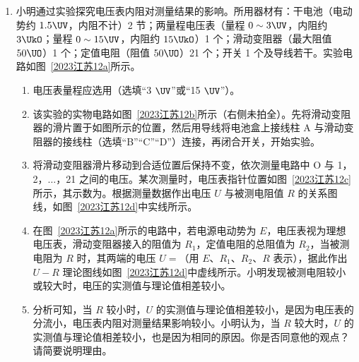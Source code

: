 \documentclass[\gkver]{gaokaozhenti}
\begin{document}
\begin{enumerate}

{经过 A 点的动能较小}
{在 A、B 之间的运动时间较短}
{在 A、B 之间克服摩擦力做的功较小}


\item
小明通过实验探究电压表内阻对测量结果的影响。所用器材有：干电池（电动势约 $1.5\UV$，内阻不计）2 节；两量程电压表（量程 $0\sim 3\UV$，内阻约 $3\UkO$；量程 $0\sim 15\UV$，内阻约 $15\UkO$）1 个；滑动变阻器（最大阻值 $50\UO$）1 个；定值电阻（阻值 $50\UO$）21 个；开关 1 个及导线若干。实验电路如图~\ref{2023江苏12a}所示。
\begin{enumerate}
	\item
	电压表量程应选用\tkanswer{$3\UV$}（选填“3 $\UV$”或“15 $\UV$”）。
	\item
	该实验的实物电路如图~\ref{2023江苏12b}所示（右侧未拍全）。先将滑动变阻器的滑片置于如图所示的位置，然后用导线将电池盒上接线柱 A 与滑动变阻器的接线柱（选填“B”“C”“D”）连接，再闭合开关，开始实验。
	\item
	将滑动变阻器滑片移动到合适位置后保持不变，依次测量电路中 O 与 1，2，$\ldots$，21 之间的电压。某次测量时，电压表指针位置如图~\ref{2023江苏12c}所示，其示数为\tkanswer{$1.50\UV$}。根据测量数据作出电压 $U$ 与被测电阻值 $R$ 的关系图线，如图~\ref{2023江苏12d}中实线所示。
	\item
	在图~\ref{2023江苏12a}所示的电路中，若电源电动势为 $E$，电压表视为理想电压表，滑动变阻器接入的阻值为 $R_{1}$，定值电阻的总阻值为 $R_{2}$，当被测电阻为 $R$ 时，其两端的电压 $U=$（用 $E$、$R_{1}$、$R_{2}$、$R$ 表示），据此作出 $U-R$ 理论图线如图~\ref{2023江苏12d}中虚线所示。小明发现被测电阻较小或较大时，电压的实测值与理论值相差较小。
	\item
	分析可知，当 $R$ 较小时，$U$ 的实测值与理论值相差较小，是因为电压表的分流小，电压表内阻对测量结果影响较小。小明认为，当 $R$ 较大时，$U$ 的实测值与理论值相差较小，也是因为相同的原因。你是否同意他的观点？请简要说明理由。
\end{enumerate}


\end{enumerate}
\end{document}
